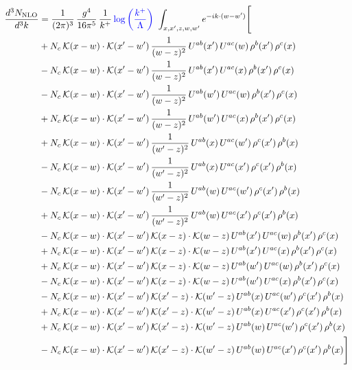 \documentclass[9pt]{article}
\numberwithin{equation}{section}
\begin{document}
\begin{align}
\frac{d^3N_{\rm NLO}}{d^3k} & =  \frac{1}{(2\pi)^{3}}\,\frac{g^{4}}{16\pi^{5}}\,\frac{1}{k^{+}}\,{\color{blue}\log{\left(\frac{k^{+}}{\Lambda}\right)}}\,\, \int_{x,x',z,w,w'}e^{-ik\cdot(w-w')}\Bigg[\notag\\
&+N_{c}\,\mathcal{K}(x-w)\cdot\mathcal{K}(x'-w')\,\frac{1}{(w-z)^{2}}\,U^{ab}(x')\,U^{ac}(w)\,\rho^{b}(x')\,\rho^{c}(x)\notag\\
&-N_{c}\,\mathcal{K}(x-w)\cdot\mathcal{K}(x'-w')\,\frac{1}{(w-z)^{2}}\,U^{ab}(x')\,U^{ac}(x)\,\rho^{b}(x')\,\rho^{c}(x)\notag\\
&-N_{c}\,\mathcal{K}(x-w)\cdot\mathcal{K}(x'-w')\,\frac{1}{(w-z)^{2}}\,U^{ab}(w')\,U^{ac}(w)\,\rho^{b}(x')\,\rho^{c}(x)\notag\\
&+N_{c}\,\mathcal{K}(x-w)\cdot\mathcal{K}(x'-w')\,\frac{1}{(w-z)^{2}}\,U^{ab}(w')\,U^{ac}(x)\,\rho^{b}(x')\,\rho^{c}(x)\notag\\
&+N_{c}\,\mathcal{K}(x-w)\cdot\mathcal{K}(x'-w')\,\frac{1}{(w'-z)^{2}}\,U^{ab}(x)\,U^{ac}(w')\,\rho^{c}(x')\,\rho^{b}(x)\notag\\
&-N_{c}\,\mathcal{K}(x-w)\cdot\mathcal{K}(x'-w')\,\frac{1}{(w'-z)^{2}}\,U^{ab}(x)\,U^{ac}(x')\,\rho^{c}(x')\,\rho^{b}(x)\notag\\
&-N_{c}\,\mathcal{K}(x-w)\cdot\mathcal{K}(x'-w')\,\frac{1}{(w'-z)^{2}}\,U^{ab}(w)\,U^{ac}(w')\,\rho^{c}(x')\,\rho^{b}(x)\notag\\
&+N_{c}\,\mathcal{K}(x-w)\cdot\mathcal{K}(x'-w')\,\frac{1}{(w'-z)^{2}}\,U^{ab}(w)\,U^{ac}(x')\,\rho^{c}(x')\,\rho^{b}(x)\notag\\
&-N_{c}\,\mathcal{K}(x-w)\cdot\mathcal{K}(x'-w')\,\mathcal{K}(x-z)\cdot\mathcal{K}(w-z)\,U^{ab}(x')\,U^{ac}(w)\,\rho^{b}(x')\,\rho^{c}(x)\notag\\
&+N_{c}\,\mathcal{K}(x-w)\cdot\mathcal{K}(x'-w')\,\mathcal{K}(x-z)\cdot\mathcal{K}(w-z)\,U^{ab}(x')\,U^{ac}(x)\,\rho^{b}(x')\,\rho^{c}(x)\notag\\
&+N_{c}\,\mathcal{K}(x-w)\cdot\mathcal{K}(x'-w')\,\mathcal{K}(x-z)\cdot\mathcal{K}(w-z)\,U^{ab}(w')\,U^{ac}(w)\,\rho^{b}(x')\,\rho^{c}(x)\notag\\
&-N_{c}\,\mathcal{K}(x-w)\cdot\mathcal{K}(x'-w')\,\mathcal{K}(x-z)\cdot\mathcal{K}(w-z)\,U^{ab}(w')\,U^{ac}(x)\,\rho^{b}(x')\,\rho^{c}(x)\notag\\
&-N_{c}\,\mathcal{K}(x-w)\cdot\mathcal{K}(x'-w')\,\mathcal{K}(x'-z)\cdot\mathcal{K}(w'-z)\,U^{ab}(x)\,U^{ac}(w')\,\rho^{c}(x')\,\rho^{b}(x)\notag\\
&+N_{c}\,\mathcal{K}(x-w)\cdot\mathcal{K}(x'-w')\,\mathcal{K}(x'-z)\cdot\mathcal{K}(w'-z)\,U^{ab}(x)\,U^{ac}(x')\,\rho^{c}(x')\,\rho^{b}(x)\notag\\
&+N_{c}\,\mathcal{K}(x-w)\cdot\mathcal{K}(x'-w')\,\mathcal{K}(x'-z)\cdot\mathcal{K}(w'-z)\,U^{ab}(w)\,U^{ac}(w')\,\rho^{c}(x')\,\rho^{b}(x)\notag\\
&-N_{c}\,\mathcal{K}(x-w)\cdot\mathcal{K}(x'-w')\,\mathcal{K}(x'-z)\cdot\mathcal{K}(w'-z)\,U^{ab}(w)\,U^{ac}(x')\,\rho^{c}(x')\,\rho^{b}(x)\Bigg]
\end{align}
\end{document}
